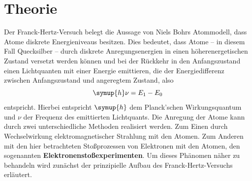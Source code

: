 \section{Theorie}
\label{sec:Theorie}

Der Franck-Hertz-Versuch belegt die Aussage von Niels Bohrs Atommodell, dass Atome diskrete
Energieniveaus besitzen.
Dies bedeutet, dass Atome -- in diesem Fall Quecksilber -- durch diskrete Anregungsenergien
in einen höherenergetischen Zustand versetzt werden können und bei der Rückkehr in den
Anfangszustand einen Lichtquanten mit einer Energie emittieren, die der Energiedifferenz zwischen
Anfangszustand und angeregtem Zustand, also
\begin{equation}
	\label{eqn:photonemission}
	\symup{h} \nu = E_1 - E_0
\end{equation}
entspricht. Hierbei entspricht $\symup{h}$ dem Planck'schen Wirkungsquantum und $\nu$ der
Frequenz des emittierten Lichtquants.
Die Anregung der Atome kann durch zwei unterschiedliche Methoden realisiert werden.
Zum Einen durch Wechselwirkung elektromagnetischer Strahlung mit den Atomen.
Zum Anderen mit den hier betrachteten Stoßprozessen von Elektronen mit den Atomen, den
sogenannten \textbf{Elektronenstoßexperimenten}.
Um dieses Phänomen näher zu behandeln wird zunächst der prinzipielle Aufbau des
Franck-Hertz-Versuchs erläutert.
